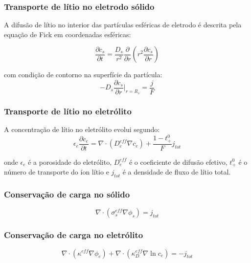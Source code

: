 \documentclass[
    12pt,
    openright,
    twoside,
    a4paper,
    brazil,
    english
]{abntex2}
\begin{document}
\subsubsection{Transporte de lítio no eletrodo sólido}

A difusão de lítio no interior das partículas esféricas de eletrodo é descrita
pela equação de Fick em coordenadas esféricas:

\begin{equation}
  \frac{\partial c_s}{\partial t} = \frac{D_s}{r^2}\frac{\partial}{\partial r}
  \left(r^2 \frac{\partial c_s}{\partial r}\right)
  \label{eq:difusao_solido}
\end{equation}

com condição de contorno na superfície da partícula:
\begin{equation}
  -D_s \frac{\partial c_s}{\partial r}\bigg|_{r=R_s} = \frac{j}{F}
\end{equation}

\subsubsection{Transporte de lítio no eletrólito}

A concentração de lítio no eletrólito evolui segundo:
\begin{equation}
  \epsilon_e \frac{\partial c_e}{\partial t} = \nabla \cdot
  \left(D_e^{eff} \nabla c_e\right) + \frac{1-t_+^0}{F} j_{tot}
  \label{eq:difusao_eletrolito}
\end{equation}

onde $\epsilon_e$ é a porosidade do eletrólito, $D_e^{eff}$ é o coeficiente de
difusão efetivo, $t_+^0$ é o número de transporte do íon lítio e $j_{tot}$ é
a densidade de fluxo de lítio total.

\subsubsection{Conservação de carga no sólido}

\begin{equation}
  \nabla \cdot (\sigma_s^{eff} \nabla \phi_s) = j_{tot}
  \label{eq:potencial_solido}
\end{equation}

\subsubsection{Conservação de carga no eletrólito}

\begin{equation}
  \nabla \cdot (\kappa^{eff} \nabla \phi_e) +
  \nabla \cdot \left(\kappa_D^{eff} \nabla \ln c_e\right) = -j_{tot}
  \label{eq:potencial_eletrolito}
\end{equation}
\end{document}
